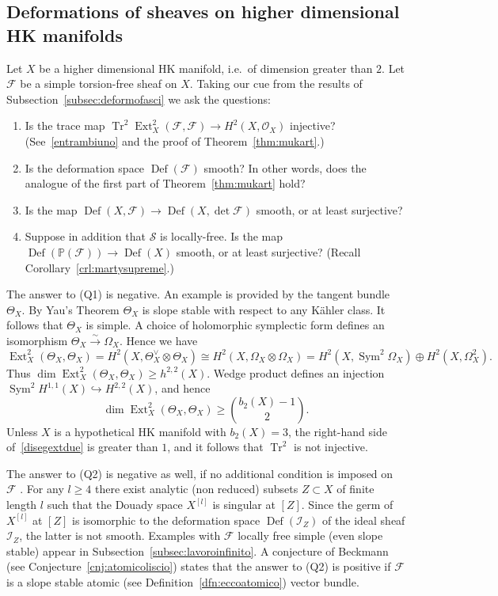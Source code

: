 \documentclass[11pt]{amsart}
\newcommand{\PP}{{\mathbb P}}
\let\mathcal\mathscr
\def\cF{\mathcal{F}}
\def\cI{\mathcal{I}}
\def\cO{\mathcal{O}}
\def\cS{\mathcal{S}}
\DeclareMathOperator{\Def}{Def}
\DeclareMathOperator{\Ext}{Ext}
\DeclareMathOperator{\Sym}{Sym}
\DeclareMathOperator{\Tr}{Tr}
\def\hra{\hookrightarrow}
\theoremstyle{definition}
\theoremstyle{remark}
\begin{document}
\subsection{Deformations of sheaves on higher dimensional HK manifolds}\label{subsec:defasci}
%
%
\setcounter{equation}{0}
%
Let $X$ be a higher dimensional HK manifold, i.e.~of dimension greater than $2$. Let $\cF$ be a simple torsion-free sheaf on $X$. Taking our cue from the results  of Subsection~\ref{subsec:deformofasci} we ask the questions:
%
\begin{enumerate}
%
\item[(Q1)]
%
Is  the trace map $\Tr^2\Ext^2_X(\cF,\cF) \to H^2(X,\cO_X)$ injective? 
(See~\eqref{entrambiuno} and the proof of Theorem~\ref{thm:mukart}.)
%
\item[(Q2)]
%
Is the deformation space $\Def(\cF)$ smooth? In other words, does the analogue of the first part of 
Theorem~\ref{thm:mukart} hold?
%
\item[(Q3)]
%
Is the map $\Def(X,\cF) \to \Def(X,\det\cF)$ smooth, or at least surjective? 
%
%
\item[(Q4)]
%
Suppose in addition that $\cS$ is locally-free. Is the  
map $\Def(\PP(\cF)) \to \Def(X)$  smooth, or at least surjective? (Recall  Corollary~\ref{crl:martysupreme}.)
%
\end{enumerate}
%
The answer to (Q1) is negative. An example is provided by the tangent bundle $\Theta_X$. By Yau's Theorem $\Theta_X$ is slope stable with respect to any K\"ahler class. It follows that $\Theta_X$ is simple. A choice of holomorphic symplectic form defines an isomorphism $\Theta_X\xrightarrow{\sim}\Omega_X$. Hence we have
%
\begin{equation*}
%
\Ext^2_X(\Theta_X,\Theta_X)=H^2(X,\Theta_X^{\vee}\otimes \Theta_X)\cong H^2(X,\Omega_X\otimes \Omega_X)=
 H^2(X,\Sym^2\Omega_X)\oplus H^2(X,\Omega^2_X).
%
\end{equation*}
%
Thus $\dim \Ext^2_X(\Theta_X,\Theta_X)\ge h^{2,2}(X)$. Wedge product defines an injection $\Sym^2 H^{1,1}(X)\hra H^{2,2}(X)$, and hence 
%
\begin{equation}\label{disegextdue}
%
\dim \Ext^2_X(\Theta_X,\Theta_X)\ge {b_2(X)-1\choose 2}.
%
\end{equation}
%
Unless $X$ is a hypothetical HK manifold with $b_2(X)=3$, the right-hand side of~\eqref{disegextdue} is greater than $1$, and it follows that $\Tr^2$ is not injective.

 

The answer to (Q2) is negative as well, if no additional condition is imposed on $\cF$ . For any $l\ge 4$ there exist analytic (non reduced) subsets $Z\subset X$ of finite length $l$ such that the Douady space $X^{[l]}$ is singular at $[Z]$. Since the germ of $X^{[l]}$  at $[Z]$ is isomorphic to the deformation space $\Def(\cI_Z)$ of the ideal sheaf $\cI_Z$, the latter is not smooth. Examples with $\cF$ locally free simple (even slope stable) appear in  Subsection~\ref{subsec:lavoroinfinito}. A conjecture of Beckmann (see Conjecture~\ref{cnj:atomicoliscio}) states that the answer to (Q2) is positive if $\cF$ is a slope stable atomic  (see Definition~\ref{dfn:eccoatomico}) vector bundle.
\end{document}
